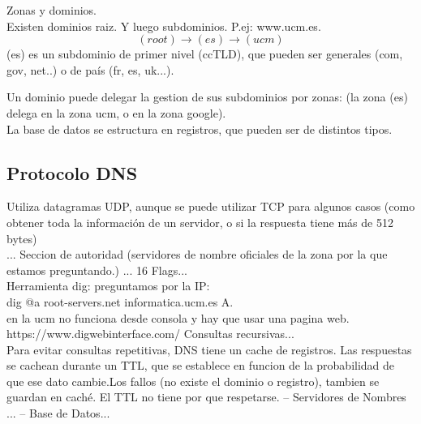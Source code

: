 Zonas y dominios.
\\Existen dominios raiz. Y luego subdominios. P.ej: www.ucm.es.
\\
\[(root) \rightarrow (es) \rightarrow (ucm)\]
(es) es un subdominio de primer nivel (ccTLD), que pueden ser generales (com, gov, net..) o de país (fr, es, uk...).

Un dominio puede delegar la gestion de sus subdominios por zonas: (la zona (es) delega en la zona ucm, o en la zona google).
\\

La base de datos se estructura en registros, que pueden ser de distintos tipos.

\subsection{Protocolo DNS}
Utiliza datagramas UDP, aunque se puede utilizar TCP para algunos casos (como obtener toda la información de un servidor, o si la respuesta tiene más de 512 bytes)
\\
...
Seccion de autoridad (servidores de nombre oficiales de la zona por la que estamos preguntando.)
...
16 Flags...
\\
Herramienta dig: preguntamos por la IP:\\
dig @a root-servers.net informatica.ucm.es A.\\
en la ucm no funciona desde consola y hay que usar una pagina web. https://www.digwebinterface.com/
Consultas recursivas...\\Para evitar consultas repetitivas, DNS tiene un cache de registros. Las respuestas se cachean durante un TTL, que se establece en funcion de la probabilidad de que ese dato cambie.Los fallos (no existe el dominio o registro), tambien se guardan en caché. El TTL no tiene por que respetarse.
-- Servidores de Nombres ...
-- Base de Datos...

